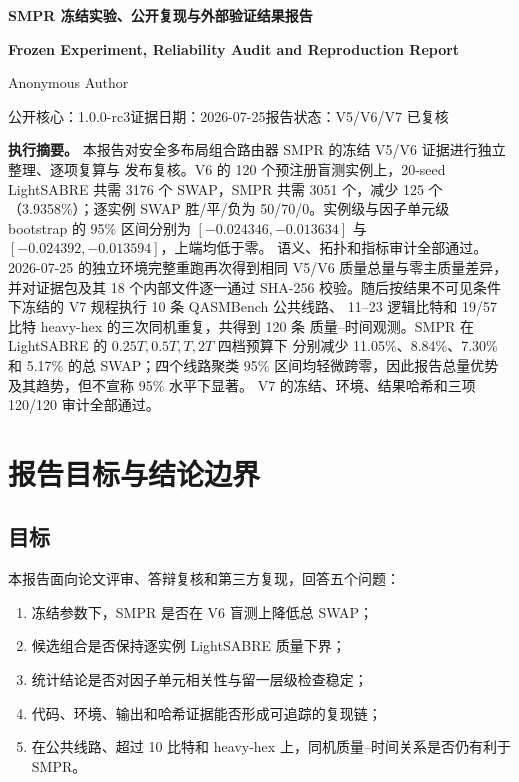 \documentclass[11pt,a4paper]{article}
\newcommand{\headingfonts}{%
  \cnsans
  \setTransitionsForLatin{\latinsans}{\cnsans}%
  \cnsans
}
\begin{document}
\begin{center}
  {\headingfonts\fontsize{21}{29}\selectfont\bfseries
  SMPR 冻结实验、公开复现与外部验证结果报告\par}
  \vspace{0.45em}
  {\latinsans\large\bfseries
  Frozen Experiment, Reliability Audit and Reproduction Report\par}
  \vspace{1.1em}
  {\large Anonymous Author\par}
  \vspace{0.3em}
  {\small 公开核心：1.0.0-rc3\quad 证据日期：2026-07-25\quad 报告状态：V5/V6/V7 已复核\par}
\end{center}

\vspace{0.8em}

\begin{summarybox}
\textbf{执行摘要。}
本报告对安全多布局组合路由器 SMPR 的冻结 V5/V6 证据进行独立整理、逐项复算与
发布复核。V6 的 120 个预注册盲测实例上，20-seed LightSABRE 共需 3176 个
SWAP，SMPR 共需 3051 个，减少 125 个（3.9358\%）；逐实例 SWAP 胜/平/负为
50/70/0。实例级与因子单元级 bootstrap 的 95\% 区间分别为
$[-0.024346,-0.013634]$ 与 $[-0.024392,-0.013594]$，上端均低于零。
语义、拓扑和指标审计全部通过。2026-07-25 的独立环境完整重跑再次得到相同
V5/V6 质量总量与零主质量差异，并对证据包及其 18 个内部文件逐一通过 SHA-256
校验。随后按结果不可见条件下冻结的 V7 规程执行 10 条 QASMBench 公共线路、
11--23 逻辑比特和 19/57 比特 heavy-hex 的三次同机重复，共得到 120 条
质量--时间观测。SMPR 在 LightSABRE 的 $0.25T,0.5T,T,2T$ 四档预算下
分别减少 11.05\%、8.84\%、7.30\% 和 5.17\% 的总 SWAP；四个线路聚类
95\% 区间均轻微跨零，因此报告总量优势及其趋势，但不宣称 95\% 水平下显著。
V7 的冻结、环境、结果哈希和三项 120/120 审计全部通过。
\end{summarybox}

\tableofcontents
\newpage

\section{报告目标与结论边界}

\subsection{目标}

本报告面向论文评审、答辩复核和第三方复现，回答五个问题：

\begin{enumerate}
  \item 冻结参数下，SMPR 是否在 V6 盲测上降低总 SWAP；
  \item 候选组合是否保持逐实例 LightSABRE 质量下界；
  \item 统计结论是否对因子单元相关性与留一层级检查稳定；
  \item 代码、环境、输出和哈希证据能否形成可追踪的复现链；
  \item 在公共线路、超过 10 比特和 heavy-hex 上，同机质量--时间关系是否仍有利于 SMPR。
\end{enumerate}
\end{document}
